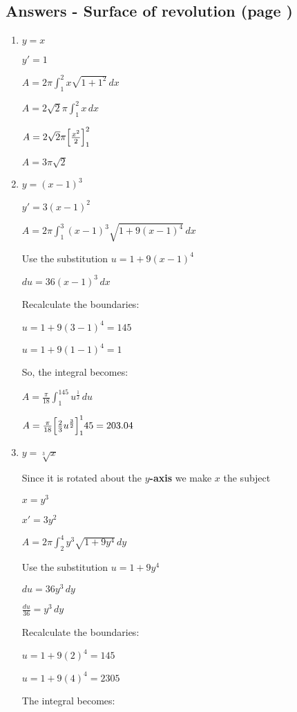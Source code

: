 \documentclass[../main.tex]{subfiles}
\begin{document}
\subsection*{Answers - Surface of revolution (page \pageref{Surface of revolution})}
\label{Surface of revolution answers}
\begin{enumerate}[itemsep=0.7cm]
    \item 
    $y=x$
    
    $y'=1$
    
    $A=2\pi \int_1^2 x\sqrt{1+1^2}\,dx$

    $A=2\sqrt{2}\pi \int_1^2 x\,dx$

    $A=2\sqrt{2}\pi \Bigl[\frac{x^2}{2}\Bigr]_1^2$

    $A=3\pi\sqrt{2}$

    \item 
    $y=(x-1)^3$
    
    $y'=3(x-1)^2$

    $A=2\pi \int_1^3 (x-1)^3 \sqrt{1+9(x-1)^4}\,dx$

    Use the substitution $u=1+9(x-1)^4$

    $du=36(x-1)^3\,dx$

    Recalculate the boundaries:

    $u=1+9(3-1)^4=145$

    $u=1+9(1-1)^4=1$

    So, the integral becomes:

    $A=\frac{\pi}{18}\int_1^{145} u^{\frac{1}{2}}\,du$

    $A=\frac{\pi}{18}\Bigl[\frac{2}{3}u^{\frac{3}{2}}\Bigr]_1^145=203.04$


    \item 
    $y=\sqrt[3]{x}$
    
    Since it is rotated about the \textbf{$y$-axis} we make $x$ the subject
    
    $x=y^3$

    $x'=3y^2$

    $A=2\pi \int_2^4 y^3\sqrt{1+9y^4}\,dy$

    Use the substitution $u=1+9y^4$

    $du=36y^3\,dy$

    $\frac{du}{36}=y^3\,dy$

    Recalculate the boundaries:

    $u=1+9(2)^4=145$

    $u=1+9(4)^4=2305$

    The integral becomes:


\end{enumerate}
\end{document}
